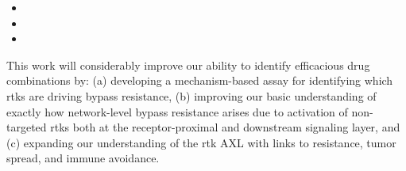 \begin{itemize}[noitemsep]
	\item \SpecificAimThreeA
	\item \SpecificAimThreeB
	\item \SpecificAimThreeC
\end{itemize}

This work will considerably improve our ability to identify efficacious drug combinations by: (a) developing a mechanism-based assay for identifying which \glspl{rtk} are driving bypass resistance, (b) improving our basic understanding of exactly how network-level bypass resistance arises due to activation of non-targeted \glspl{rtk} both at the receptor-proximal and downstream signaling layer, and (c) expanding our understanding of the \gls{rtk} AXL with links to resistance, tumor spread, and immune avoidance.
